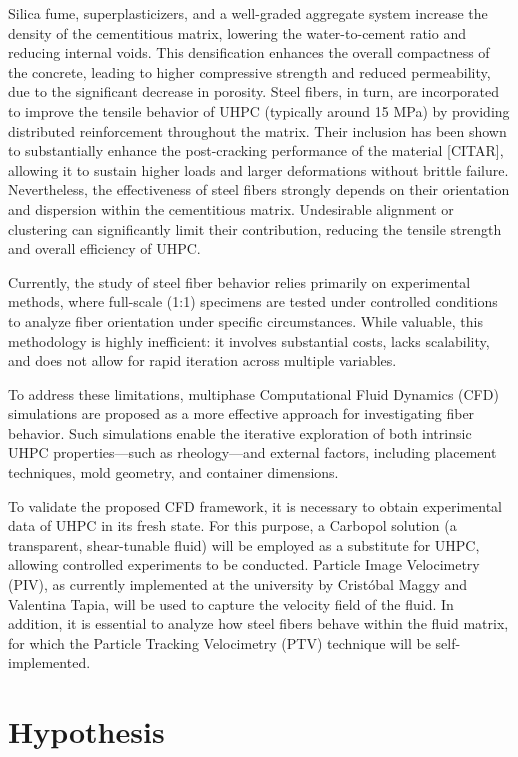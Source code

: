 Silica fume, superplasticizers, and a well-graded aggregate system increase the density of the cementitious matrix, lowering the water-to-cement ratio and reducing internal voids. This densification enhances the overall compactness of the concrete, leading to higher compressive strength and reduced permeability, due to the significant decrease in porosity.
Steel fibers, in turn, are incorporated to improve the tensile behavior of UHPC (typically around 15 MPa) by providing distributed reinforcement throughout the matrix. Their inclusion has been shown to substantially enhance the post-cracking performance of the material [CITAR], allowing it to sustain higher loads and larger deformations without brittle failure. Nevertheless, the effectiveness of steel fibers strongly depends on their orientation and dispersion within the cementitious matrix. Undesirable alignment or clustering can significantly limit their contribution, reducing the tensile strength and overall efficiency of UHPC.

Currently, the study of steel fiber behavior relies primarily on experimental methods, where full-scale (1:1) specimens are tested under controlled conditions to analyze fiber orientation under specific circumstances. While valuable, this methodology is highly inefficient: it involves substantial costs, lacks scalability, and does not allow for rapid iteration across multiple variables.

To address these limitations, multiphase Computational Fluid Dynamics (CFD) simulations are proposed as a more effective approach for investigating fiber behavior. Such simulations enable the iterative exploration of both intrinsic UHPC properties—such as rheology—and external factors, including placement techniques, mold geometry, and container dimensions.

To validate the proposed CFD framework, it is necessary to obtain experimental data of UHPC in its fresh state. For this purpose, a Carbopol solution (a transparent, shear-tunable fluid) will be employed as a substitute for UHPC, allowing controlled experiments to be conducted. Particle Image Velocimetry (PIV), as currently implemented at the university by Cristóbal Maggy and Valentina Tapia, will be used to capture the velocity field of the fluid. In addition, it is essential to analyze how steel fibers behave within the fluid matrix, for which the Particle Tracking Velocimetry (PTV) technique will be self-implemented.

\section{Hypothesis}

